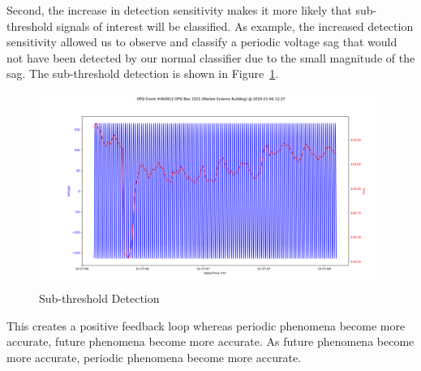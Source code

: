 Second, the increase in detection sensitivity makes it more likely that sub-threshold signals of interest will be classified. As example, the increased detection sensitivity allowed us to observe and classify a periodic voltage sag that would not have been detected by our normal classifier due to the small magnitude of the sag. The sub-threshold detection is shown in Figure~\ref{fig:sub-threshold-detection}.

\begin{figure}[H]
    \centering
    \includegraphics[width=0.85\linewidth]{images/pilot/subthreshold-signal.png}
    \caption{Sub-threshold Detection}
    \label{fig:sub-threshold-detection}
\end{figure}

This creates a positive feedback loop whereas periodic phenomena become more accurate, future phenomena become more accurate. As future phenomena become more accurate, periodic phenomena become more accurate.






